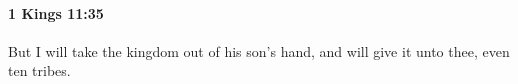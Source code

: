 
		\paragraph{1 Kings 11:35} %
			\label{1KINGS-11-35}

			But I will take the kingdom out of his son’s hand, and will give it unto thee, even ten tribes.



